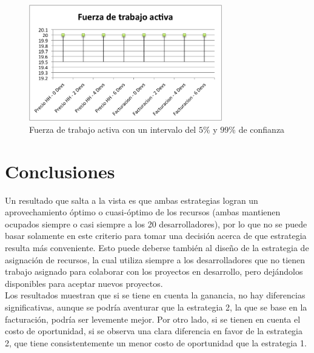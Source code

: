\begin{figure}[H]

\begin{center}
    \includegraphics[width=0.75\textwidth,height=0.75\textheight,keepaspectratio]{./images/objetive-active-workforce.png}
\end{center}

\label{fig:objective-active-workforce}
\caption{Fuerza de trabajo activa con un intervalo del $5\%$ y $99\%$ de confianza}

\end{figure}

\section{Conclusiones}

Un resultado que salta a la vista es que ambas estrategias logran un aprovechamiento óptimo o cuasi-óptimo de los recursos (ambas mantienen ocupados siempre
o casi siempre a los 20 desarrolladores), por lo que no se puede basar solamente en este criterio para tomar una decisión acerca de que estrategia resulta más conveniente.
Esto puede deberse también al diseño de la estrategia de asignación de recursos, la cual utiliza siempre a los desarrolladores que no tienen trabajo asignado para colaborar con 
los proyectos en desarrollo, pero dejándolos disponibles para aceptar nuevos proyectos.\\

Los resultados muestran que si se tiene en cuenta la ganancia, no hay diferencias significativas, aunque se podría 
aventurar que la estrategia 2, la que se base en la facturación, podría ser levemente mejor. Por otro lado, si se tienen en 
cuenta el costo de oportunidad, si se observa una clara diferencia en favor de la estrategia 2, que tiene consistentemente un menor costo de 
oportunidad que la estrategia 1.\\


